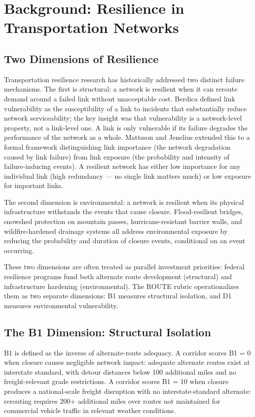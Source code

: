 \section{Background: Resilience in Transportation Networks}
\label{sec:background}

\subsection{Two Dimensions of Resilience}

Transportation resilience research has historically addressed two distinct failure mechanisms. The first is structural: a network is resilient when it can reroute demand around a failed link without unacceptable cost. Berdica \citep{Berdica2002} defined link vulnerability as the susceptibility of a link to incidents that substantially reduce network serviceability; the key insight was that vulnerability is a network-level property, not a link-level one. A link is only vulnerable if its failure degrades the performance of the network as a whole. Mattsson and Jenelius \citep{Mattsson2015} extended this to a formal framework distinguishing link importance (the network degradation caused by link failure) from link exposure (the probability and intensity of failure-inducing events). A resilient network has either low importance for any individual link (high redundancy --- no single link matters much) or low exposure for important links.

The second dimension is environmental: a network is resilient when its physical infrastructure withstands the events that cause closure. Flood-resilient bridges, snowshed protection on mountain passes, hurricane-resistant barrier walls, and wildfire-hardened drainage systems all address environmental exposure by reducing the probability and duration of closure events, conditional on an event occurring.

These two dimensions are often treated as parallel investment priorities: federal resilience programs fund both alternate route development (structural) and infrastructure hardening (environmental). The ROUTE rubric operationalizes them as two separate dimensions: B1 measures structural isolation, and D1 measures environmental vulnerability.

\subsection{The B1 Dimension: Structural Isolation}

B1 is defined as the inverse of alternate-route adequacy. A corridor scores B1 = 0 when closure causes negligible network impact: adequate alternate routes exist at interstate standard, with detour distances below 100 additional miles and no freight-relevant grade restrictions. A corridor scores B1 = 10 when closure produces a national-scale freight disruption with no interstate-standard alternate: rerouting requires 200+ additional miles over routes not maintained for commercial vehicle traffic in relevant weather conditions.

